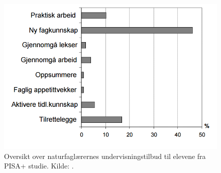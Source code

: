 \documentclass[main.tex]{subfiles}
\begin{document}
\begin{figure}[h!]
\includegraphics[scale = 0.6]{../figures/undervisnings_aktivitet.png}
\caption{Oversikt over naturfaglærernes undervisningstilbud til elevene fra PISA+ studie. Kilde: 
\protect{}.}
\label{fig:odeg10}
\end{figure}
\end{document}
